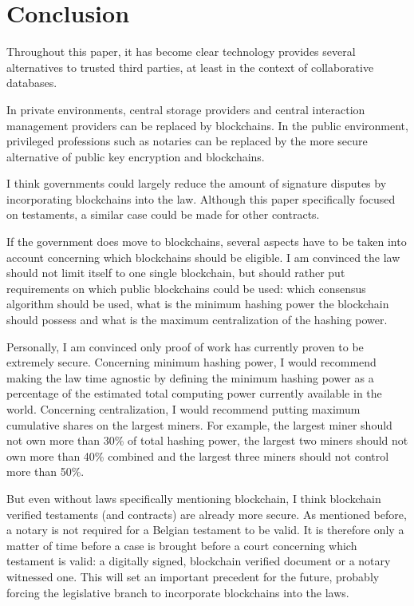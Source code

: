 \chapter{Conclusion}

Throughout this paper, it has become clear technology provides several alternatives to trusted third parties, at least in the context of collaborative databases. 

In  private environments, central storage providers and central interaction management providers can be replaced by blockchains. In the public environment, privileged professions such as notaries can be replaced by the more secure alternative of public key encryption and blockchains.

I think governments could largely reduce the amount of signature disputes by incorporating blockchains into the law. Although this paper specifically focused on testaments, a similar case could be made for other contracts. 

If the government does move to blockchains, several aspects have to be taken into account concerning which blockchains should be eligible. I am convinced the law should not limit itself to one single blockchain, but should rather put requirements on which public blockchains could be used: which consensus algorithm should be used, what is the minimum hashing power the blockchain should possess and what is the maximum centralization of the hashing power. 

Personally, I am convinced only proof of work has currently proven to be extremely secure. Concerning minimum hashing power, I would recommend making the law time agnostic by defining the minimum hashing power as a percentage of the estimated total computing power currently available in the world. Concerning centralization, I would recommend putting maximum cumulative shares on the largest miners. For example, the largest miner should not own more than 30\% of total hashing power, the largest two miners should not own more than 40\% combined and the largest three miners should not control more than 50\%. 

But even without laws specifically mentioning blockchain, I think blockchain verified testaments (and contracts) are already more secure. As mentioned before, a notary is not required for a Belgian testament to be valid. It is therefore only a matter of time before a case is brought before a court concerning which testament is valid: a digitally signed, blockchain verified document or a notary witnessed one. This will set an important precedent for the future, probably forcing the legislative branch to incorporate blockchains into the laws.



